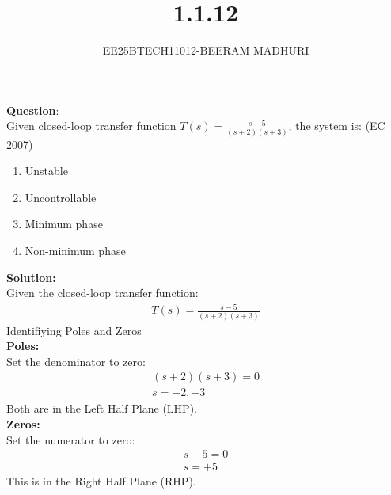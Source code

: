 \documentclass[journal]{IEEEtran}
\begin{document}

\vspace{3cm}

\title{1.1.12}
\author{EE25BTECH11012-BEERAM MADHURI}
{\let\newpage\relax\maketitle}

\renewcommand{\thefigure}{\theenumi}
\renewcommand{\thetable}{\theenumi}
\setlength{\intextsep}{10pt} %


\renewcommand{\thetable}{\theenumi}


\textbf{Question}:\\
 Given closed-loop transfer function $T(s) = \frac{s-5}{(s+2)(s+3)}$, the system is: \hfill (EC 2007)

\begin{enumerate}
    \item[a)] Unstable
    \item[b)] Uncontrollable
    \item[c)] Minimum phase
    \item[d)] Non-minimum phase
\end{enumerate}

\textbf{Solution:}\\
Given the closed-loop transfer function:
\begin{align}
    T(s) = \frac{s - 5}{(s + 2)(s + 3)}
\end{align}
Identifiying Poles and Zeros\\
\textbf{Poles:}\\
Set the denominator to zero: \\
\begin{align}
    (s + 2)(s + 3) = 0\\
    s = -2 ,-3
\end{align}
 Both are in the Left Half Plane (LHP).\\
\textbf{Zeros:}\\
Set the numerator to zero: 
\begin{align}
    s - 5 = 0\\
    s = +5
\end{align}
This is in the Right Half Plane (RHP).\\
\end{document}
